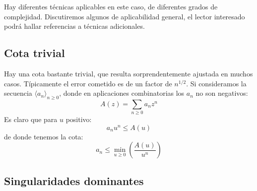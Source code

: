   Hay diferentes técnicas aplicables en este caso,
  de diferentes grados de complejidad.
  Discutiremos algunos de aplicabilidad general,
  el lector interesado
  podrá hallar referencias a técnicas adicionales.

\subsection{Cota trivial}
\label{sec:trivial-sum-bound}

  Hay una cota bastante trivial,
  que resulta sorprendentemente ajustada en muchos casos.
  Típicamente el error cometido es de un factor de \(n^{1/2}\).
  Si consideramos la secuencia \(\langle a_n \rangle_{n \ge 0}\),
  donde en aplicaciones combinatorias los \(a_n\) no son negativos:
  \begin{equation}
    \label{eq:example-gf}
    A(z)
      = \sum_{n \ge 0} a_n z^n
  \end{equation}
  Es claro que para \(u\) positivo:
  \begin{equation*}
    a_n u^n
      \le A(u)
  \end{equation*}
  de donde tenemos la cota:
  \begin{equation}
    \label{eq:trivial-bound}
    a_n
      \le \min_{u \ge 0} \left( \frac{A(u)}{u^n} \right)
  \end{equation}

\subsection{Singularidades dominantes}
\label{sec:dominating-singularities}

